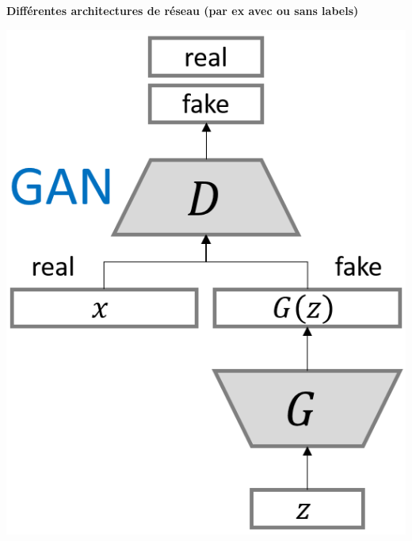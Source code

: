 \documentclass[a0,portrait]{a0poster}
\begin{document}
\begin{multicols}{2}
\begin{tcolorbox}[colback=blue!5!white,colframe=blue!75!black,title={\section*{Différents types de GAN}}]
\textbf{Différentes architectures de réseau (par ex avec ou sans labels)}
\begin{center}
\begin{minipage}{0.24\textwidth}
    \includegraphics[width=1.0\textwidth]{./GAN_normal.png}
\end{minipage}
\begin{minipage}{0.31\textwidth}

\end{minipage}
\end{center}
\end{tcolorbox}
\end{multicols}
\end{document}
